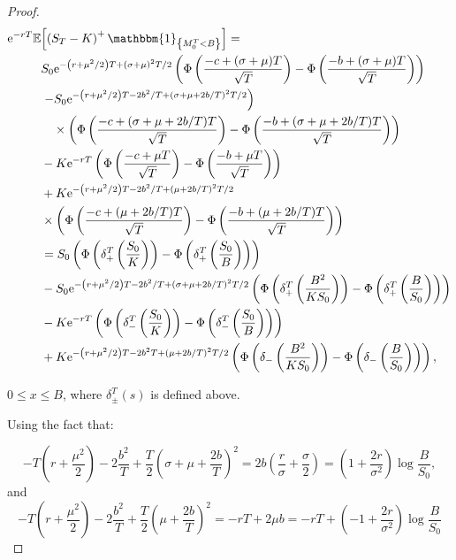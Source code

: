 \begin{appendices}
\begin{proof}
$$
\begin{aligned}
\mathrm{e}^{-r T} \mathbb{E} & {\left[\left(S_{T}-K\right)^{+} \mathbbm{1}_{\left\{M_{0}^{T}<B\right\}}\right] } = \\
& S_{0} \mathrm{e}^{-\left(r+\mu^{2} / 2\right) T+(\sigma+\mu)^{2} T / 2}\left(\Phi\left(\frac{-c+(\sigma+\mu) T}{\sqrt{T}}\right)-\Phi\left(\frac{-b+(\sigma+\mu) T}{\sqrt{T}}\right)\right) \\
& \left.-S_{0} \mathrm{e}^{-\left(r+\mu^{2} / 2\right) T-2 b^{2} / T+(\sigma+\mu+2 b / T)^{2} T / 2}\right) \\
& \quad \times\left(\Phi\left(\frac{-c+(\sigma+\mu+2 b / T) T}{\sqrt{T}}\right)-\Phi\left(\frac{-b+(\sigma+\mu+2 b / T) T}{\sqrt{T}}\right)\right) \\
& -K \mathrm{e}^{-r T}\left(\Phi\left(\frac{-c+\mu T}{\sqrt{T}}\right)-\Phi\left(\frac{-b+\mu T}{\sqrt{T}}\right)\right) \\
& +K \mathrm{e}^{-\left(r+\mu^{2} / 2\right) T-2 b^{2} / T+(\mu+2 b / T)^{2} T / 2} \\
& \times\left(\Phi\left(\frac{-c+(\mu+2 b / T) T}{\sqrt{T}}\right)-\Phi\left(\frac{-b+(\mu+2 b / T) T}{\sqrt{T}}\right)\right) \\
& = S_{0}\left(\Phi\left(\delta_{+}^{T}\left(\frac{S_{0}}{K}\right)\right)-\Phi\left(\delta_{+}^{T}\left(\frac{S_{0}}{B}\right)\right)\right) \\
& -S_{0} \mathrm{e}^{-\left(r+\mu^{2} / 2\right) T-2 b^{2} / T+(\sigma+\mu+2 b / T)^{2} T / 2}\left(\Phi\left(\delta_{+}^{T}\left(\frac{B^{2}}{K S_{0}}\right)\right)-\Phi\left(\delta_{+}^{T}\left(\frac{B}{S_{0}}\right)\right)\right) \\
& -K \mathrm{e}^{-r T}\left(\Phi\left(\delta_{-}^{T}\left(\frac{S_{0}}{K}\right)\right)-\Phi\left(\delta_{-}^{T}\left(\frac{S_{0}}{B}\right)\right)\right) \\
& +K \mathrm{e}^{-\left(r+\mu^{2} / 2\right) T-2 b^{2} T+(\mu+2 b / T)^{2} T / 2}\left(\Phi\left(\delta_{-}\left(\frac{B^{2}}{K S_{0}}\right)\right)-\Phi\left(\delta_{-}\left(\frac{B}{S_{0}}\right)\right)\right),
\end{aligned}
$$

$0 \leq x \leq B$, where $\delta_{ \pm}^{T}(s)$ is defined above.

Using the fact that:

$$
-T\left(r+\frac{\mu^{2}}{2}\right)-2 \frac{b^{2}}{T}+\frac{T}{2}\left(\sigma+\mu+\frac{2 b}{T}\right)^{2}=2 b\left(\frac{r}{\sigma}+\frac{\sigma}{2}\right)=\left(1+\frac{2 r}{\sigma^{2}}\right) \log \frac{B}{S_{0}},
$$
and
$$
-T\left(r+\frac{\mu^{2}}{2}\right)-2 \frac{b^{2}}{T}+\frac{T}{2}\left(\mu+\frac{2 b}{T}\right)^{2}=-r T+2 \mu b=-r T+\left(-1+\frac{2 r}{\sigma^{2}}\right) \log \frac{B}{S_{0}}
$$


\end{proof}
\end{appendices}
